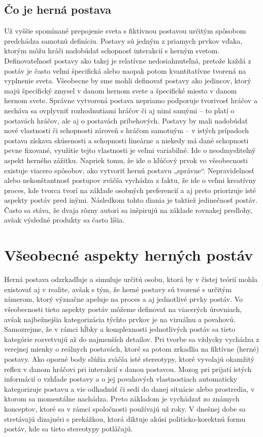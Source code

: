 \documentclass[10pt,twoside,slovak,a4paper]{article}
\begin{document}
\subsection{Čo je herná postava}\label{2.0:2.1}
Už vyššie spomínané prepojenie sveta s fiktívnou postavou určitým spôsobom predchádza samotnú definíciu. Postavy sú jedným z priamych prvkov vďaka, ktorým môžu hráči nadobúdať schopnosť interakcií s herným svetom. Definovateľnosť postavy ako takej je relatívne nedosiahnuteľná, pretože každá z postáv je často veľmi špecifická alebo naopak potom kvantitatívne tvorená na vyplnenie sveta. Všeobecne by sme mohli definovať postavy ako jedincov, ktorý majú špecifický zmysel v danom hernom svete a špecifické miesto v danom hernom svete. Správne vytvorená postava nepriamo podporuje tvorivosť hráčov a necháva sa ovplyvniť rozhodnutiami hráčov či aj nimi samými – to platí o postavách hráčov, ale aj o postavách príbehových. Postavy by mali nadobúdať nové vlastnosti či schopnosti zároveň s hráčom samotným – v istých prípadoch postava získava skúsenosti a schopnosti lineárne a niekedy má dané schopnosti pevne fixované, využitie tejto vlastnosti je veľmi variabilné.  Ide o neodmysliteľný aspekt herného zážitku. Napriek tomu, že ide o kľúčový prvok vo všeobecnosti existuje viacero spôsobov, ako vytvoriť hernú postavu „správne“. Nepravidelnosť alebo nekonštantnosť postupov zväčša vychádza z faktu, že ide o veľmi kreatívny proces, kde tvorca tvorí na základe osobných preferencií a aj preto priorizuje isté aspekty postáv pred inými. Následkom tohto diania je taktiež jedinečnosť postáv. Často sa stáva, že dvaja rôzny autori sa inšpirujú na základe rovnakej predlohy, avšak výsledné produkty sa často líšia.

\section{Všeobecné aspekty herných postáv} \label{3.0}
Herná postava odzrkadľuje a simuluje určitú osobu, ktorá by v čistej teórií mohla existovať aj v realite, avšak s tým, že herné postavy sú tvorené s určitým zámerom, ktorý význačne apeluje na proces a aj jednotlivé prvky postáv. Vo všeobecnosti tieto aspekty postáv môžeme definovať na viacerých úrovniach, avšak najbežnejšia kategorizácia týchto prvkov je na vizuálnu a povahovú. Samozrejme, že v rámci hĺbky a komplexnosti jednotlivých postáv sa tieto kategórie rozvetvujú až do najmenších detailov. Pri tvorbe sa vždycky vychádza z verejnej mienky o reálnych postavách, ktoré sa potom zrkadlia na fiktívne (herné) postavy. Ako oporné body slúžia zväčša isté stereotypy, ktoré vyvolajú okamžitý reflex v danom hráčovi pri interakcií s danou postavou. Mozog pri prijatí istých informácií o vzhľade postavy a o jej povahových vlastnostiach automaticky kategorizuje postavu a vie odhadnúť  či sedí do danej situácie alebo prostredia, v ktorom sa momentálne nachádza.  Preto základom je vychádzať zo známych konceptov, ktoré sa v rámci spoločnosti používajú už roky. V dnešnej dobe sa stretávajú dizajnéri s prekážkou, ktorá diktuje akúsi politicko-korektnú formu postáv, kde sa tieto stereotypy potláčajú. 
\end{document}

